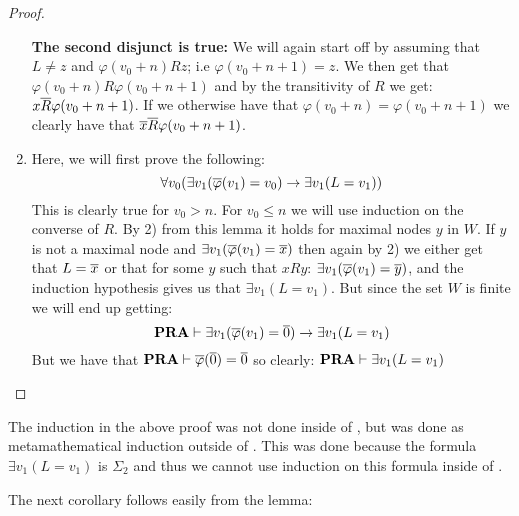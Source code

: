 \documentclass[../main.tex]{subfiles}
\begin{document}
\begin{proof}
\begin{enumerate}
			\textbf{The second disjunct is true:} We will again
			start off by assuming that $L\not =z$ and
			$\varphi(v_0+n)Rz$; i.e $\varphi(v_0+n+1)=z$. We then
			get that $\varphi(v_0+n)R\varphi(v_0+n+1)$ and by the
			transitivity of $R$ we get: $x\overline R\varphi(v_0+n+1)$.
			If we otherwise have that
			$\varphi(v_0+n)=\varphi(v_0+n+1)$ we clearly have that
			$\overline x\overline R\varphi(v_0+n+1)$.

		\item Here, we will first prove the following:
			$$\forall v_0(\exists v_1(\overline
			\varphi(v_1)=v_0)\rightarrow\exists v_1(L=v_1))$$
			This is clearly true for $v_0> n$. For $v_0\leq n$ we
			will use induction on the converse of $R$. By 2) from
			this lemma it holds for maximal nodes $y$ in $W$. If
			$y$ is not a maximal node and $\exists v_1(\overline
			\varphi(v_1)=\overline x)$ then again by 2) we either get
			that $L=\overline x$ or that for some $y$ such that $xRy$:
			$\exists v_1(\overline \varphi(v_1)=\overline y)$, and the induction
			hypothesis gives us that $\exists v_1(L=v_1)$. But
			since the set $W$ is finite we will end up
			getting:
			\[\text{\textbf{PRA}}\vdash\exists v_1(\overline\varphi(v_1)=\overline
			0)\rightarrow\exists v_1(L=v_1)\]
			But we have that $\text{\textbf{PRA}}\vdash \overline \varphi(\overline 0)=\overline 0$
			so clearly: $\text{\textbf{PRA}}\vdash\exists v_1(L=v_1)$
\end{enumerate}
\end{proof}

The induction in the above proof was not done inside of \PRA, but was done as
metamathematical induction outside of \PRA. This was done because the formula
$\exists v_1(L=v_1)$ is $\Sigma_2$ and thus we cannot use induction on this
formula inside of \PRA. 

The next corollary follows easily from the lemma:
\end{document}
